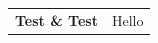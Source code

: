 ﻿\documentclass{article}
\begin{document}
\begin{tabular}{ll}
\textbf{Test \& Test} & Hello \\
\end{tabular}
\end{document}
